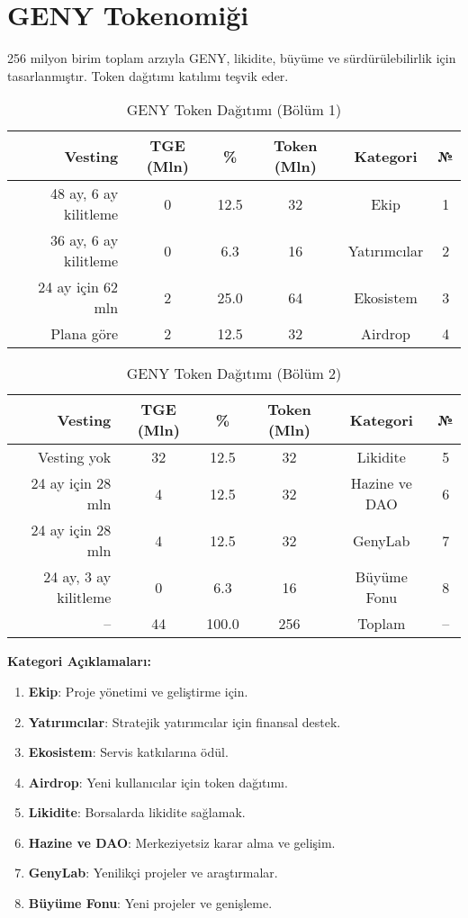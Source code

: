 \documentclass[a4paper,12pt,openany]{book}
\begin{document}
\section*{GENY Tokenomiği}
256 milyon birim toplam arzıyla GENY, likidite, büyüme ve sürdürülebilirlik için tasarlanmıştır. Token dağıtımı katılımı teşvik eder.

\begin{table}[h]
\centering
\caption{GENY Token Dağıtımı (Bölüm 1)}
\small
\begin{tabular}{r c c c c c}
\hline
\textbf{Vesting} & \textbf{TGE (Mln)} & \textbf{\%} & \textbf{Token (Mln)} & \textbf{Kategori} & \textbf{№} \\
\hline
48 ay, 6 ay kilitleme & 0 & 12.5 & 32 & Ekip & 1 \\
36 ay, 6 ay kilitleme & 0 & 6.3 & 16 & Yatırımcılar & 2 \\
24 ay için 62 mln & 2 & 25.0 & 64 & Ekosistem & 3 \\
Plana göre & 2 & 12.5 & 32 & Airdrop & 4 \\
\hline
\end{tabular}
\end{table}

\begin{table}[h]
\centering
\caption{GENY Token Dağıtımı (Bölüm 2)}
\small
\begin{tabular}{r c c c c c}
\hline
\textbf{Vesting} & \textbf{TGE (Mln)} & \textbf{\%} & \textbf{Token (Mln)} & \textbf{Kategori} & \textbf{№} \\
\hline
Vesting yok & 32 & 12.5 & 32 & Likidite & 5 \\
24 ay için 28 mln & 4 & 12.5 & 32 & Hazine ve DAO & 6 \\
24 ay için 28 mln & 4 & 12.5 & 32 & GenyLab & 7 \\
24 ay, 3 ay kilitleme & 0 & 6.3 & 16 & Büyüme Fonu & 8 \\
\hline
-- & 44 & 100.0 & 256 & Toplam & -- \\
\hline
\end{tabular}
\end{table}

\textbf{Kategori Açıklamaları:}
\begin{enumerate}
    \item \textbf{Ekip}: Proje yönetimi ve geliştirme için.
    \item \textbf{Yatırımcılar}: Stratejik yatırımcılar için finansal destek.
    \item \textbf{Ekosistem}: Servis katkılarına ödül.
    \item \textbf{Airdrop}: Yeni kullanıcılar için token dağıtımı.
    \item \textbf{Likidite}: Borsalarda likidite sağlamak.
    \item \textbf{Hazine ve DAO}: Merkeziyetsiz karar alma ve gelişim.
    \item \textbf{GenyLab}: Yenilikçi projeler ve araştırmalar.
    \item \textbf{Büyüme Fonu}: Yeni projeler ve genişleme.
\end{enumerate}
\end{document}
